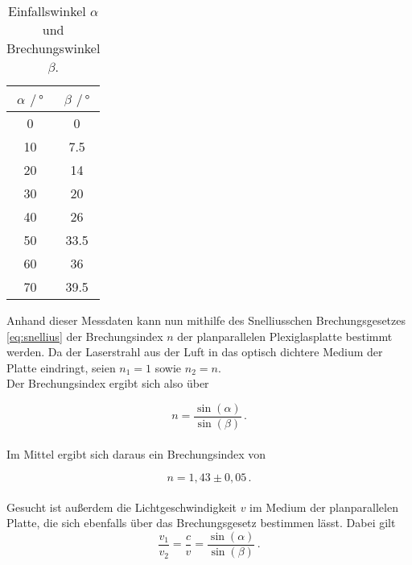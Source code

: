 \begin{table}[H]
    \centering
    \caption{Einfallswinkel $\alpha$ und Brechungswinkel $\beta$.}
    \label{tab:messung2}
    \begin{tabular}{S[table-format=2.0] S[table-format=2.1]}
      \toprule
        {$\alpha$ $\mathbin{/} \, \unit{\degree}$} & {$\beta$ $\mathbin{/} \, \unit{\degree}$}\\
                        &                0   \\
      10                  &                7.5 \\
      20                  &                14  \\
      30                  &                20  \\
      40                  &                26  \\
      50                  &                33.5\\
      60                  &                36  \\
      70                  &                39.5\\
    \bottomrule
    \end{tabular}
\end{table}

Anhand dieser Messdaten kann nun mithilfe des Snelliusschen Brechungsgesetzes \eqref{eq:snellius} der Brechungsindex $n$ der planparallelen Plexiglasplatte bestimmt werden.
Da der Laserstrahl aus der Luft in das optisch dichtere Medium der Platte eindringt, seien $n_1 = 1$ sowie $n_2 = n$. \\

Der Brechungsindex ergibt sich also über

\begin{equation*}
    n = \frac{\sin(\alpha)}{\sin(\beta)} \,.
\end{equation*} \\

Im Mittel ergibt sich daraus ein Brechungsindex von

\begin{equation*}
    n = 1,43 \pm 0,05 \,.
\end{equation*} \\

Gesucht ist außerdem die Lichtgeschwindigkeit $v$ im Medium der planparallelen Platte, die sich ebenfalls über das Brechungsgesetz bestimmen lässt.
Dabei gilt
\begin{equation*}
    \frac{v_1}{v_2} = \frac{c}{v} = \frac{\sin(\alpha)}{\sin(\beta)} \,.
\end{equation*} \\

